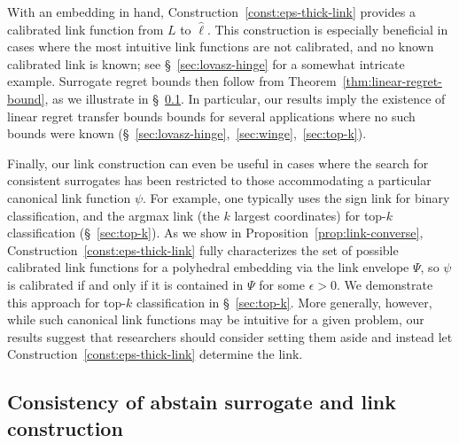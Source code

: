 \documentclass[11pt]{article}
\newcommand{\Comments}{1}
\newcommand{\mynote}[2]{\ifnum\Comments=1\textcolor{#1}{#2}\fi}
\newcommand{\raf}[1]{\mynote{darkgreen}{[RF: #1]}}
\begin{document}
With an embedding in hand, Construction~\ref{const:eps-thick-link} provides a calibrated link function from $L$ to $\hat\ell$.
This construction is especially beneficial in cases where the most intuitive link functions are not calibrated, and no known calibrated link is known; see \S~\ref{sec:lovasz-hinge} for a somewhat intricate example.
Surrogate regret bounds then follow from Theorem~\ref{thm:linear-regret-bound}, as we illustrate in \S~\ref{sec:abstain}.
In particular, our results imply the existence of linear regret transfer bounds bounds for several applications where no such bounds were known (\S~\ref{sec:lovasz-hinge},~\ref{sec:winge},~\ref{sec:top-k}).

Finally, our link construction can even be useful in cases where the search for consistent surrogates has been restricted to those accommodating a particular canonical link function $\psi$.
For example, one typically uses the sign link for binary classification, and the argmax link (the $k$ largest coordinates) for top-$k$ classification (\S~\ref{sec:top-k}).
As we show in Proposition~\ref{prop:link-converse}, Construction~\ref{const:eps-thick-link} fully characterizes the set of possible calibrated link functions for a polyhedral embedding via the link envelope $\Psi$, so $\psi$ is calibrated if and only if it is contained in $\Psi$ for some $\epsilon>0$.
We demonstrate this approach for top-$k$ classification in \S~\ref{sec:top-k}.
More generally, however, while such canonical link functions may be intuitive for a given problem, our results suggest that researchers should consider setting them aside and instead let Construction~\ref{const:eps-thick-link} determine the link.


\subsection{Consistency of abstain surrogate and link construction}
\label{sec:abstain}
\end{document}
